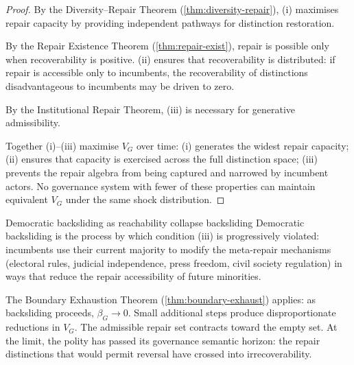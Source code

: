 \documentclass[12pt,twoside,openright]{book}
\newcounter{exercise}[chapter]
\begin{document}
\begin{proof}
  By the Diversity--Repair Theorem
  (\cref{thm:diversity-repair}), (i) maximises repair
  capacity by providing independent pathways for
  distinction restoration.

  By the Repair Existence Theorem
  (\cref{thm:repair-exist}), repair is possible only
  when recoverability is positive. (ii) ensures that
  recoverability is distributed: if repair is
  accessible only to incumbents, the recoverability of
  distinctions disadvantageous to incumbents may be
  driven to zero.

  By the Institutional Repair Theorem, (iii) is
  necessary for generative admissibility.

  Together (i)--(iii) maximise $V_G$ over time:
  (i) generates the widest repair capacity; (ii) ensures
  that capacity is exercised across the full distinction
  space; (iii) prevents the repair algebra from being
  captured and narrowed by incumbent actors.
  No governance system with fewer of these properties
  can maintain equivalent $V_G$ under the same
  shock distribution.
\end{proof}

\begin{remark}{Democratic backsliding as reachability collapse}%
  {backsliding}
  Democratic backsliding is the process by which
  condition (iii) is progressively violated: incumbents
  use their current majority to modify the meta-repair
  mechanisms (electoral rules, judicial independence,
  press freedom, civil society regulation) in ways that
  reduce the repair accessibility of future minorities.

  The Boundary Exhaustion Theorem
  (\cref{thm:boundary-exhaust}) applies: as backsliding
  proceeds, $\beta_G \to 0$. Small additional steps
  produce disproportionate reductions in $V_G$. The
  admissible repair set contracts toward the empty set.
  At the limit, the polity has passed its governance
  semantic horizon: the repair distinctions that would
  permit reversal have crossed into irrecoverability.
\end{remark}
\end{document}
